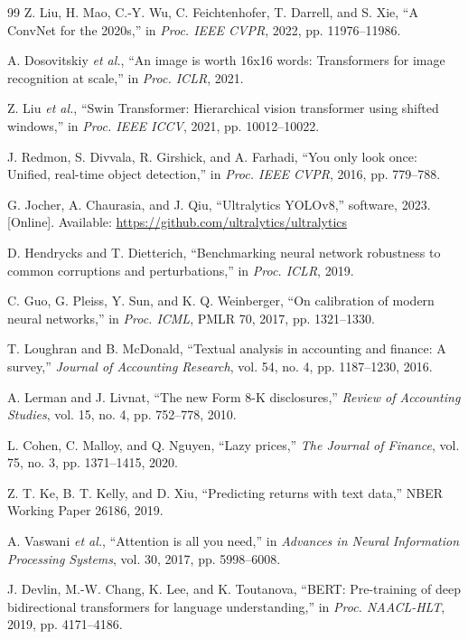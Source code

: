 \documentclass[conference]{IEEEtran}
\begin{document}
\begin{thebibliography}{99}
 Z. Liu, H. Mao, C.-Y. Wu, C. Feichtenhofer, T. Darrell, and S. Xie, ``A ConvNet for the 2020s,'' in \emph{Proc. IEEE CVPR}, 2022, pp. 11976--11986.

 A. Dosovitskiy \emph{et al.}, ``An image is worth 16x16 words: Transformers for image recognition at scale,'' in \emph{Proc. ICLR}, 2021.

 Z. Liu \emph{et al.}, ``Swin Transformer: Hierarchical vision transformer using shifted windows,'' in \emph{Proc. IEEE ICCV}, 2021, pp. 10012--10022.

 J. Redmon, S. Divvala, R. Girshick, and A. Farhadi, ``You only look once: Unified, real-time object detection,'' in \emph{Proc. IEEE CVPR}, 2016, pp. 779--788.

 G. Jocher, A. Chaurasia, and J. Qiu, ``Ultralytics YOLOv8,'' software, 2023. [Online]. Available: \url{https://github.com/ultralytics/ultralytics}

 D. Hendrycks and T. Dietterich, ``Benchmarking neural network robustness to common corruptions and perturbations,'' in \emph{Proc. ICLR}, 2019.

 C. Guo, G. Pleiss, Y. Sun, and K. Q. Weinberger, ``On calibration of modern neural networks,'' in \emph{Proc. ICML}, PMLR 70, 2017, pp. 1321--1330.

 T. Loughran and B. McDonald, ``Textual analysis in accounting and finance: A survey,'' \emph{Journal of Accounting Research}, vol. 54, no. 4, pp. 1187--1230, 2016.

 A. Lerman and J. Livnat, ``The new Form 8-K disclosures,'' \emph{Review of Accounting Studies}, vol. 15, no. 4, pp. 752--778, 2010.

 L. Cohen, C. Malloy, and Q. Nguyen, ``Lazy prices,'' \emph{The Journal of Finance}, vol. 75, no. 3, pp. 1371--1415, 2020.

 Z. T. Ke, B. T. Kelly, and D. Xiu, ``Predicting returns with text data,'' NBER Working Paper 26186, 2019.

 A. Vaswani \emph{et al.}, ``Attention is all you need,'' in \emph{Advances in Neural Information Processing Systems}, vol. 30, 2017, pp. 5998--6008.

 J. Devlin, M.-W. Chang, K. Lee, and K. Toutanova, ``BERT: Pre-training of deep bidirectional transformers for language understanding,'' in \emph{Proc. NAACL-HLT}, 2019, pp. 4171--4186.


\end{thebibliography}
\end{document}
